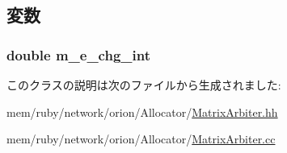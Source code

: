 \subsection{変数}
\hypertarget{classMatrixArbiter_a185cba11681e698e1867fae8e8967e82}{
\subsubsection[{m\_\-e\_\-chg\_\-int}]{\setlength{\rightskip}{0pt plus 5cm}double {\bf m\_\-e\_\-chg\_\-int}}}
\label{classMatrixArbiter_a185cba11681e698e1867fae8e8967e82}


このクラスの説明は次のファイルから生成されました:\begin{DoxyCompactItemize}
\item 
mem/ruby/network/orion/Allocator/\hyperlink{MatrixArbiter_8hh}{MatrixArbiter.hh}\item 
mem/ruby/network/orion/Allocator/\hyperlink{MatrixArbiter_8cc}{MatrixArbiter.cc}\end{DoxyCompactItemize}
